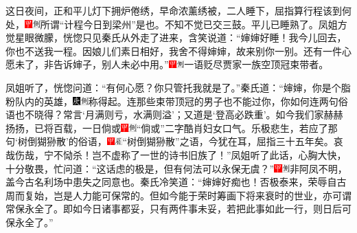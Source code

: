 这日夜间，正和平儿灯下拥炉倦绣，早命浓薰绣被，二人睡下，屈指算行程该到何处，{\includegraphics[width=3mm]{../Images/00002}\includegraphics[width=3mm]{../Images/00011}\footnotesize \kaishu 所谓“计程今日到梁州”是也。}不知不觉已交三鼓。平儿已睡熟了。凤姐方觉星眼微朦，恍惚只见秦氏从外走了进来，含笑说道：“婶婶好睡！我今儿回去，你也不送我一程。因娘儿们素日相好，我舍不得婶婶，故来别你一别。还有一件心愿未了，非告诉婶子，别人未必中用。”{\includegraphics[width=3mm]{../Images/00002}\includegraphics[width=3mm]{../Images/00011}\footnotesize \kaishu 一语贬尽贾家一族空顶冠束带者。}

凤姐听了，恍惚问道：“有何心愿？你只管托我就是了。”秦氏道：“婶婶，你是个脂粉队内的英雄，{\includegraphics[width=3mm]{../Images/00004}\includegraphics[width=3mm]{../Images/00011}\footnotesize \kaishu 称得起。}连那些束带顶冠的男子也不能过你，你如何连两句俗语也不晓得？常言‘月满则亏，水满则溢’；又道是‘登高必跌重’。如今我们家赫赫扬扬，已将百载，一日倘或{\includegraphics[width=3mm]{../Images/00002}\includegraphics[width=3mm]{../Images/00011}\footnotesize \kaishu “倘或”二字酷肖妇女口气。}乐极悲生，若应了那句‘树倒猢狲散’的俗语，{\includegraphics[width=3mm]{../Images/00002}\includegraphics[width=3mm]{../Images/00010}\footnotesize \kaishu “树倒猢狲散”之语，今犹在耳，屈指三十五年矣。哀哉伤哉，宁不恸杀！}岂不虚称了一世的诗书旧族了！”凤姐听了此话，心胸大快，十分敬畏，忙问道：“这话虑的极是，但有何法可以永保无虞？”{\includegraphics[width=3mm]{../Images/00002}\includegraphics[width=3mm]{../Images/00011}\footnotesize \kaishu 非阿凤不明，盖今古名利场中患失之同意也。}秦氏冷笑道：“婶婶好痴也！否极泰来，荣辱自古周而复始，岂是人力能可保常的。但如今能于荣时筹画下将来衰时的世业，亦可谓常保永全了。即如今日诸事都妥，只有两件事未妥，若把此事如此一行，则日后可保永全了。”

